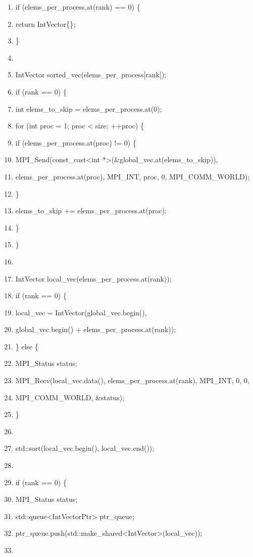 \documentclass[]{article}
\begin{document}
\begin{enumerate}
\item
  if (elems\_per\_process.at(rank) == 0) \{
\item
  return IntVector\{\};
\item
  \}
\item
\item
  IntVector sorted\_vec(elems\_per\_process{[}rank{]});
\item
  if (rank == 0) \{
\item
  int elems\_to\_skip = elems\_per\_process.at(0);
\item
  for (int proc = 1; proc \textless{} size; ++proc) \{
\item
  if (elems\_per\_process.at(proc) != 0) \{
\item
  MPI\_Send(const\_cast\textless{}int
  *\textgreater{}(\&global\_vec.at(elems\_to\_skip)),
\item
  elems\_per\_process.at(proc), MPI\_INT, proc, 0, MPI\_COMM\_WORLD);
\item
  \}
\item
  elems\_to\_skip += elems\_per\_process.at(proc);
\item
  \}
\item
  \}
\item
\item
  IntVector local\_vec(elems\_per\_process.at(rank));
\item
  if (rank == 0) \{
\item
  local\_vec = IntVector(global\_vec.begin(),
\item
  global\_vec.begin() + elems\_per\_process.at(rank));
\item
  \} else \{
\item
  MPI\_Status status;
\item
  MPI\_Recv(local\_vec.data(), elems\_per\_process.at(rank), MPI\_INT,
  0, 0,
\item
  MPI\_COMM\_WORLD, \&status);
\item
  \}
\item
\item
  std::sort(local\_vec.begin(), local\_vec.end());
\item
\item
  if (rank == 0) \{
\item
  MPI\_Status status;
\item
  std::queue\textless{}IntVectorPtr\textgreater{} ptr\_queue;
\item
  ptr\_queue.push(std::make\_shared\textless{}IntVector\textgreater{}(local\_vec));
\item

\end{enumerate}
\end{document}
